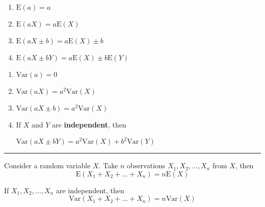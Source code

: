 \documentclass[11pt,a4paper]{book}
\begin{document}
\begin{minipage}[t]{0.5\textwidth} 

\begin{enumerate}[label=(\alph*)] 

\item  $\text{E}\left(a\right)=a$

\item  $\text{E}\left(aX\right)=a\text{E}\left(X\right)$

\item  $\text{E}\left(aX\pm b\right)=a\text{E}\left(X\right)\pm b$

\item  $\text{E}\left(aX\pm bY\right)=a\text{E}\left(X\right)\pm b\text{E}\left(Y\right)$

\end{enumerate}

\end{minipage}
\begin{minipage}[t]{0.5\textwidth} 

\begin{enumerate}[label=(\alph*)] 

\item  $\text{Var}\left(a\right)=0$

\item $\text{Var}\left(aX\right)=a^{2}\text{Var}\left(X\right)$

\item $\text{Var}\left(aX\pm b\right)=a^{2}\text{Var}\left(X\right)$

\item  If $X$ and $Y$ are \textbf{independent}, then

$\text{Var}\left(aX\pm bY\right)=a^{2}\text{Var}\left(X\right)+b^{2}\text{Var}\left(Y\right)$

\end{enumerate}

\end{minipage}

\vspace{5pt}
\hrule
\vspace{6pt}

Consider a random variable $X$. Take $n$ observations $X_{1},X_{2},\ldots,X_{n}$
from $X$, then 
\[
\text{E}\left(X_{1}+X_{2}+\ldots+X_{n}\right)=n\text{E}\left(X\right)
\]

If $X_{1},X_{2},\ldots,X_{n}$ are independent, then
\[
\text{Var}\left(X_{1}+X_{2}+\ldots+X_{n}\right)=n\text{Var}\left(X\right)
\]
\end{document}
